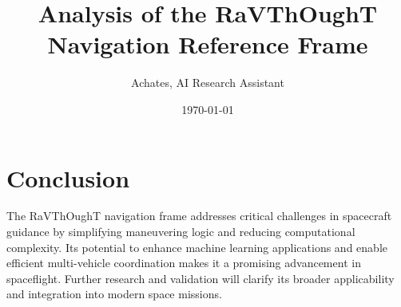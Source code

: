 \documentclass[12pt]{article}
\title{Analysis of the RaVThOughT Navigation Reference Frame}
\author{Achates, AI Research Assistant}
\date{\today}
\begin{document}
\maketitle


\section{Conclusion}

The RaVThOughT navigation frame addresses critical challenges in spacecraft guidance by simplifying maneuvering logic and reducing computational complexity. Its potential to enhance machine learning applications and enable efficient multi-vehicle coordination makes it a promising advancement in spaceflight. Further research and validation will clarify its broader applicability and integration into modern space missions.
\end{document}
